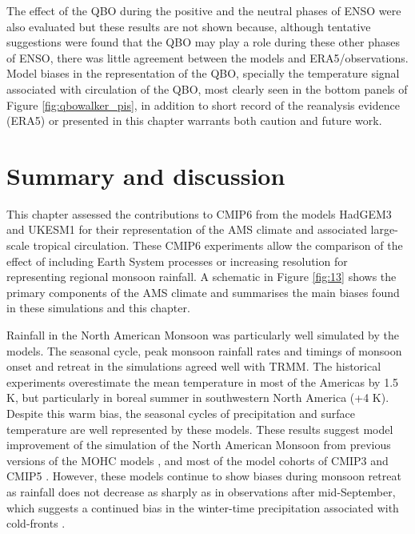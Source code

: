 The effect of the QBO during the positive and the neutral phases of ENSO were also evaluated but these results are not shown because, although tentative suggestions were found that the QBO may play a role during these other phases of ENSO, there was little agreement between the models and ERA5/observations. Model biases in the representation of the QBO, specially the temperature signal associated with circulation of the QBO, most clearly seen in the bottom panels of Figure \ref{fig:qbowalker_pis}, in addition to short record of the reanalysis evidence (ERA5) or presented in this chapter warrants both caution and future work. 

\section{Summary and discussion}



 This chapter assessed the contributions to CMIP6 from the models HadGEM3 and UKESM1 for their representation of the AMS climate and associated large-scale tropical circulation. These CMIP6 experiments allow the comparison of the effect of including Earth System processes or increasing resolution for representing regional monsoon rainfall. 
A schematic in Figure \ref{fig:13} shows the primary components of the AMS climate and summarises the main biases found in these simulations and this chapter.



Rainfall in the North American Monsoon was particularly well simulated by the models. The seasonal cycle, peak monsoon rainfall rates and timings of monsoon onset and retreat in the simulations agreed well with TRMM. The historical experiments overestimate the mean temperature in most of the Americas by 1.5 K, but particularly in boreal summer in southwestern North America (+4 K). Despite this warm bias, the seasonal cycles of precipitation and surface temperature are well represented by these models.  These results suggest model improvement of the simulation of the North American Monsoon from previous versions of the MOHC models \citep{arritt2000}, and most of the model cohorts of CMIP3 and CMIP5 \citep{geil2013}. However, these models continue to show biases during monsoon retreat as rainfall does not decrease as sharply as in observations after mid-September, which suggests a continued bias in the winter-time precipitation associated with cold-fronts \citep{adams1997}. %

